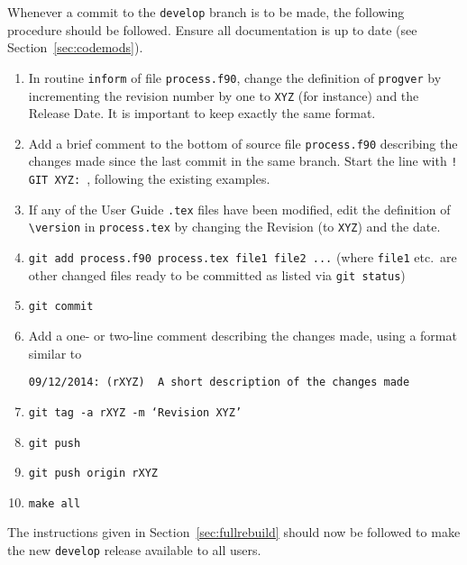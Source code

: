 Whenever a commit to the \texttt{develop} branch is to be made, the following
procedure should be followed. Ensure all documentation is up to date (see
Section~\ref{sec:codemods}).
\begin{enumerate}

\item In routine \texttt{inform} of file \texttt{process.f90}, change the
  definition of \texttt{progver} by incrementing the revision number by one to
  \texttt{XYZ} (for instance) and the Release Date. It is important to keep
  exactly the same format.

\item Add a brief comment to the bottom of source file \texttt{process.f90}
  describing the changes made since the last commit in the same branch. Start
  the line with \texttt{! GIT XYZ: }, following the existing examples.

\item If any of the User Guide \texttt{.tex} files have been modified, edit
  the definition of \verb+\version+ in \texttt{process.tex} by changing the
  Revision (to \texttt{XYZ}) and the date.

\item \texttt{git add process.f90 process.tex file1 file2 ...}  (where
  \texttt{file1} etc.\ are other changed files ready to be committed as listed
  via \texttt{git status})

\item \texttt{git commit}

\item Add a one- or two-line comment describing the changes made, using a format similar to
\begin{verbatim}
09/12/2014: (rXYZ)  A short description of the changes made
\end{verbatim}

\item \texttt{git tag -a rXYZ -m `Revision XYZ'}

\item \texttt{git push}

\item \texttt{git push origin rXYZ}

\item \texttt{make all}

\end{enumerate}

The instructions given in Section~\ref{sec:fullrebuild} should now be followed
to make the new \texttt{develop} release available to all users.


